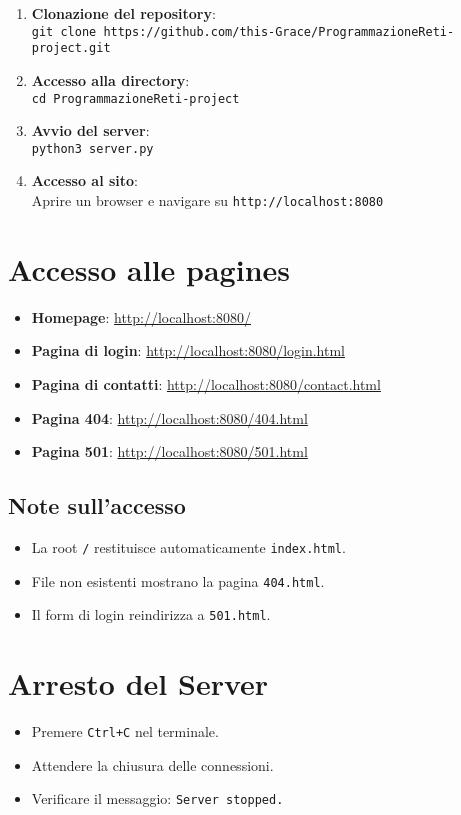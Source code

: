 \documentclass[a4paper,12pt]{report}
\begin{document}
\begin{enumerate}
    \item \textbf{Clonazione del repository}:\\
    \texttt{git clone https://github.com/this-Grace/ProgrammazioneReti-project.git}

    \item \textbf{Accesso alla directory}:\\
    \texttt{cd ProgrammazioneReti-project}

    \item \textbf{Avvio del server}:\\
    \texttt{python3 server.py}

    \item \textbf{Accesso al sito}:\\
    Aprire un browser e navigare su \texttt{http://localhost:8080}
\end{enumerate}

\section{Accesso alle pagines}

\begin{itemize}
    \item \textbf{Homepage}: \url{http://localhost:8080/}
    \item \textbf{Pagina di login}: \url{http://localhost:8080/login.html}
    \item \textbf{Pagina di contatti}: \url{http://localhost:8080/contact.html}
    \item \textbf{Pagina 404}: \url{http://localhost:8080/404.html}
    \item \textbf{Pagina 501}: \url{http://localhost:8080/501.html}
\end{itemize}

\subsection{Note sull'accesso}

\begin{itemize}
    \item La root \texttt{/} restituisce automaticamente \texttt{index.html}.
    \item File non esistenti mostrano la pagina \texttt{404.html}.
    \item Il form di login reindirizza a \texttt{501.html}.
\end{itemize}

\section{Arresto del Server}

\begin{itemize}
    \item Premere \texttt{Ctrl+C} nel terminale.
    \item Attendere la chiusura delle connessioni.
    \item Verificare il messaggio: \texttt{Server stopped.}
\end{itemize}
\end{document}
